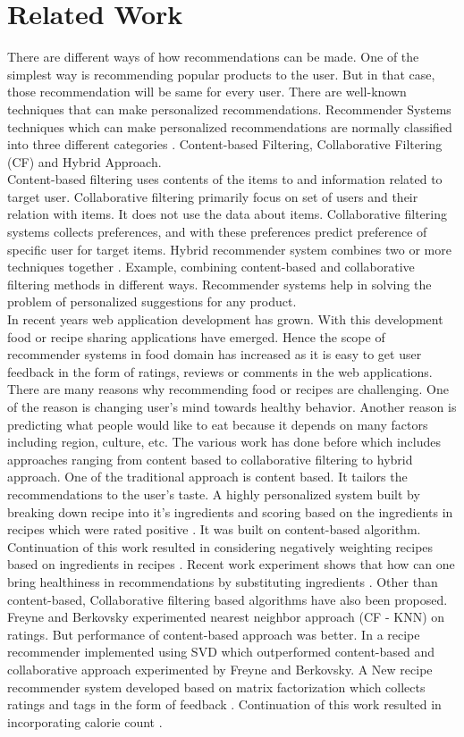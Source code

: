 
\section{Related Work}

There are different ways of how recommendations can be made. One of the simplest way is recommending popular products to the user. But in that case, those recommendation will be same for every user. There are well-known techniques that can make personalized recommendations.
Recommender Systems techniques which can make personalized recommendations are normally classified into three different categories \cite{14}. Content-based Filtering, Collaborative Filtering (CF) and Hybrid Approach.\\
Content-based filtering uses contents of the items to and information related to target user. Collaborative filtering primarily focus on set of users and their relation with items. It does not use the data about items. Collaborative filtering systems collects preferences, and with these preferences predict preference of specific user for target items. Hybrid recommender system combines two or more techniques together \cite{12}. Example, combining content-based and collaborative filtering methods in different ways. Recommender systems help in solving the problem of personalized suggestions for any product.
\\
In recent years web application development has grown. With this development food or recipe sharing applications have emerged. Hence the scope of recommender systems in food domain has increased as it is easy to get user feedback in the form of ratings, reviews or comments in the web applications.
\\
There are many reasons why recommending food or recipes are challenging. One of the reason is changing user's mind towards healthy behavior. Another reason is predicting what people would like to eat because it depends on many factors including region, culture, etc. The various work has done before which includes approaches ranging from content based to collaborative filtering to hybrid approach. One of the traditional approach is content based. It tailors the recommendations to the user's taste. A highly personalized system built by breaking down recipe into it's ingredients and scoring based on the ingredients in recipes which were rated positive \cite{13}. It was built on content-based algorithm. Continuation of this work resulted in considering negatively weighting recipes based on ingredients in recipes \cite{15}. Recent work experiment shows that how can one bring healthiness in recommendations by substituting ingredients \cite{17}. Other than content-based, Collaborative filtering based algorithms have also been proposed. Freyne and Berkovsky experimented nearest neighbor approach (CF - KNN) on ratings. But performance of content-based approach was better. In \cite{15} a recipe recommender implemented using SVD which outperformed content-based and collaborative approach experimented by Freyne and Berkovsky. A New recipe recommender system developed based on matrix factorization which collects ratings and tags in the form of feedback \cite{16}. Continuation of this work resulted in incorporating calorie count \cite{18}. 
